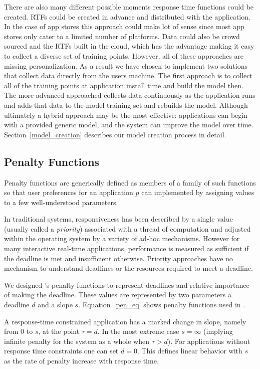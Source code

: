 There are also many different possible moments response time functions could be created.  RTFs could be created in advance and distributed with the application. In the case of app stores this approach could make lot of sense since most app stores only cater to a limited number of platforms. Data could also be crowd sourced and the RTFs built in the cloud, which has the advantage making it easy to collect a diverse set of training points.  However, all of these approaches are missing personalization.  As a result we have chosen to implement two solutions that collect data directly from the users machine.  The first approach is to collect all of the training points at application install time and build the model then.  The more advanced approached collects data continuously as the application runs and adds that data to the model training set and rebuilds the model.  Although ultimately a hybrid approach may be the most effective: applications can begin with a provided generic model, and the system can improve the model over time. Section~\ref{model_creation} describes our model creation process in detail.

\subsection*{Penalty Functions}

Penalty functions are generically defined as members of a family of such functions
so that user preferences for an application $p$ can implemented by assigning values to a few well-understood parameters.

In traditional systems, responsiveness has been described by a single value (usually called a \emph{priority}) associated with a thread of computation and adjusted within the operating system by a variety of ad-hoc mechanisms.  However for many interactive real-time applications, performance is measured as sufficient if the deadline is met and insufficient otherwise. Priority approaches have no mechanism to understand deadlines or the resources required to meet a deadline.

We designed \pacora's penalty functions to represent deadlines and relative importance of making the deadline.  These values are represented by two parameters a deadline $d$ and a slope $s$.  Equation~\ref{pen_eq} shows penalty functions used in \pacora.

A response-time constrained application has a marked change in slope, namely from 0 to $s$, at the point $\tau= d$. In the most extreme case $s = \infty$ (implying infinite penalty for the system as a whole when $\tau > d$).  For applications without response time constraints one can set $d = 0$. This defines linear behavior with $s$ as the rate of penalty increase with response time.

